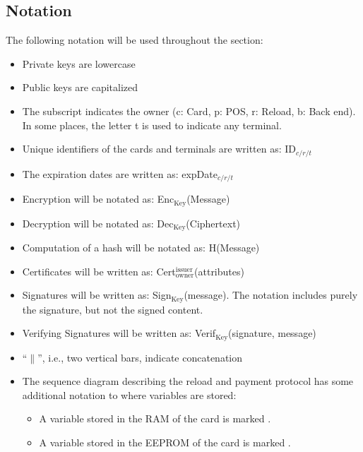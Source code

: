 \documentclass{article}
\begin{document}
\subsection{Notation} \label{sec:notation}
The following notation will be used throughout the section:
\begin{itemize}
    \item Private keys are lowercase
    
    \item Public keys are capitalized
    
    \item The subscript indicates the owner (c: Card, p: POS, r: Reload, b: Back end).
    In some places, the letter t is used to indicate any terminal.

    \item Unique identifiers of the cards and terminals are written as: ID$_{c/r/t}$

    \item The expiration dates are written as: expDate$_{c/r/t}$

    \item Encryption will be notated as: Enc$_{\textrm{Key}}$(Message)

    \item Decryption will be notated as: Dec$_{\textrm{Key}}$(Ciphertext)
    
    \item Computation of a hash will be notated as: H(Message)
    
    \item Certificates will be written as: Cert$_\textrm{owner}^\textrm{issuer}$(attributes)

    \item Signatures will be written as: Sign$_{\textrm{Key}}$(message).
    The notation includes purely the signature, but not the signed content.

    \item Verifying Signatures will be written as: Verif$_{\textrm{Key}}$(signature, message)

    \item ``$\|$'', i.e., two vertical bars, indicate concatenation

    \item The sequence diagram describing the reload and payment protocol has some additional notation to where variables are stored:
    \begin{itemize}
        \item A variable stored in the RAM of the card is marked .
        \item A variable stored in the EEPROM of the card is marked .
    \end{itemize}
\end{itemize}
\end{document}
